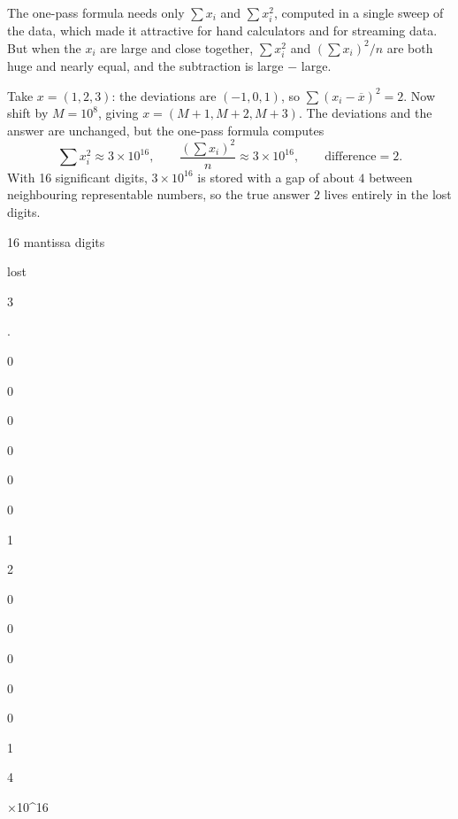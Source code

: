 \documentclass[
  letterpaper,
  DIV=11,
  numbers=noendperiod]{scrreprt}
\begin{document}
The one-pass formula needs only \(\sum x_i\) and \(\sum x_i^2\),
computed in a single sweep of the data, which made it attractive for
hand calculators and for streaming data. But when the \(x_i\) are large
and close together, \(\sum x_i^2\) and \((\sum x_i)^2/n\) are both huge
and nearly equal, and the subtraction is large − large.

Take \(x = (1, 2, 3)\): the deviations are \((-1, 0, 1)\), so
\(\sum(x_i-\overline x)^2 = 2\). Now shift by \(M = 10^{8}\), giving
\(x = (M+1, M+2, M+3)\). The deviations and the answer are unchanged,
but the one-pass formula computes \[
\sum x_i^2 \approx 3\times10^{16}, \qquad \frac{(\sum x_i)^2}{n} \approx 3\times10^{16}, \qquad \text{difference} = 2.
\] With 16 significant digits, \(3\times10^{16}\) is stored with a gap
of about \(4\) between neighbouring representable numbers, so the true
answer \(2\) lives entirely in the lost digits.

16 mantissa digits

lost

3

.

0

0

0

0

0

0

1

2

0

0

0

0

0

1

4

×10\^{}16
\end{document}
